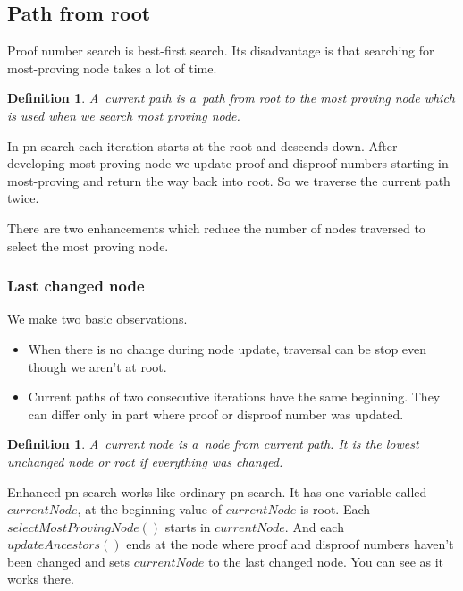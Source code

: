 \subsection{Path from root}

Proof number search is best-first search. Its disadvantage is that searching for most-proving node takes
a lot of time. 

\newtheorem*{currentPath}{Definition}	
\begin{currentPath}
	A~{\sl current path} is a~path from root to the most proving node which is
	used when we search most proving node. 
\end{currentPath}

In pn-search each iteration starts at the root and descends down. After developing
most proving node we update proof and disproof numbers starting in most-proving and 
return the way back into root. So we traverse the current path twice. 

There are two enhancements which reduce the number of nodes traversed to select the
most proving node. 

\subsubsection{Last changed node} \label{last}

We make two basic observations.
\begin{itemize}
\item When there is no change during node update, traversal can be stop even though we
aren't at root.
\item Current paths of two consecutive iterations have the same beginning. They can differ
only in part where proof or disproof number was updated.
\end{itemize}

\newtheorem*{currentNode}{Definition}	
\begin{currentNode}
A~{\sl current node} is a~node from current path. It is the lowest unchanged node or
root if everything was changed.
\end{currentNode}

Enhanced pn-search works like ordinary pn-search. It has one variable
called $currentNode$, at the beginning value of $currentNode$ is root. Each
$selectMostProvingNode()$ starts in $currentNode$. And each $updateAncestors()$
ends at the node where proof and disproof numbers haven't been changed and sets 
$currentNode$ to the last changed node. You can see as it works there. 

